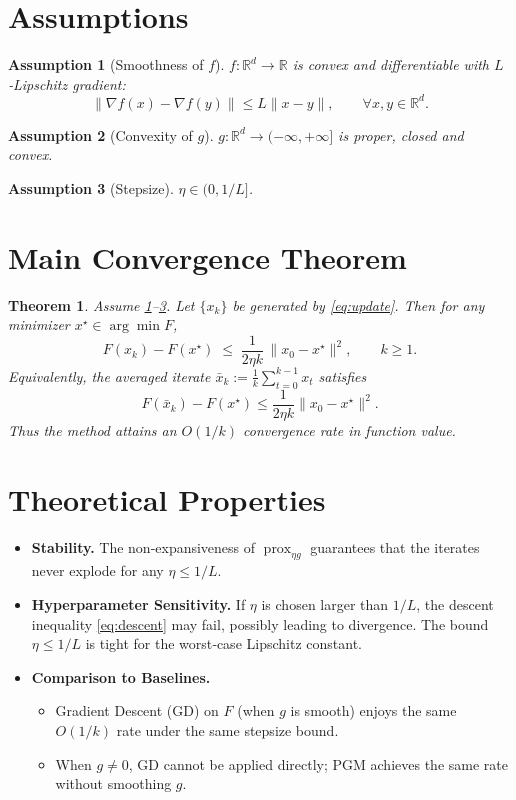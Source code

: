 \documentclass{article}
\newtheorem{theorem}{Theorem}
\newtheorem{assumption}{Assumption}
\newcommand{\prox}{\operatorname{prox}}
\newcommand{\R}{\mathbb{R}}
\begin{document}
\section*{Assumptions}
\begin{assumption}[Smoothness of $f$]
\label{ass:smooth}
$f:\R^{d}\to\R$ is convex and differentiable with $L$‑Lipschitz gradient:
\[
\|\nabla f(x)-\nabla f(y)\|\le L\|x-y\|,\qquad\forall x,y\in\R^{d}.
\]
\end{assumption}
\begin{assumption}[Convexity of $g$]
\label{ass:convex}
$g:\R^{d}\to(-\infty,+\infty]$ is proper, closed and convex.
\end{assumption}
\begin{assumption}[Stepsize]
\label{ass:stepsize}
$\eta\in(0,1/L]$.
\end{assumption}

\section*{Main Convergence Theorem}
\begin{theorem}
\label{thm:convergence}
Assume \ref{ass:smooth}–\ref{ass:stepsize}. Let $\{x_{k}\}$ be generated by \eqref{eq:update}. Then for any minimizer $x^{\star}\in\arg\min F$,
\begin{equation}
\label{eq:telescoping}
F(x_{k})-F(x^{\star})\;\le\;\frac{1}{2\eta k}\,\|x_{0}-x^{\star}\|^{2},
\qquad k\ge 1.
\end{equation}
Equivalently, the averaged iterate $\bar x_{k}:=\frac1k\sum_{t=0}^{k-1}x_{t}$ satisfies
\[
F(\bar x_{k})-F(x^{\star})\le\frac{1}{2\eta k}\|x_{0}-x^{\star}\|^{2}.
\]
Thus the method attains an $O(1/k)$ convergence rate in function value.
\end{theorem}

\section*{Theoretical Properties}
\begin{itemize}
\item \textbf{Stability.} The non‑expansiveness of $\prox_{\eta g}$ guarantees that the iterates never explode for any $\eta\le 1/L$.
\item \textbf{Hyperparameter Sensitivity.} If $\eta$ is chosen larger than $1/L$, the descent inequality \eqref{eq:descent} may fail, possibly leading to divergence. The bound $\eta\le 1/L$ is tight for the worst‑case Lipschitz constant.
\item \textbf{Comparison to Baselines.}
    \begin{itemize}
        \item Gradient Descent (GD) on $F$ (when $g$ is smooth) enjoys the same $O(1/k)$ rate under the same stepsize bound.
        \item When $g\neq0$, GD cannot be applied directly; PGM achieves the same rate without smoothing $g$.
    \end{itemize}
\end{itemize}
\end{document}
